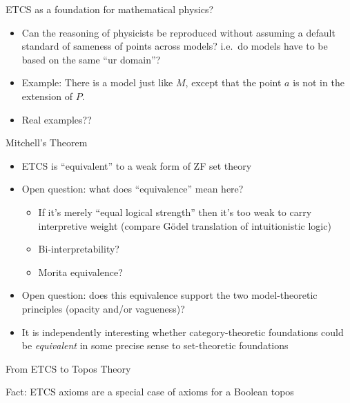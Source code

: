 \documentclass{beamer}
\begin{document}
\begin{frame}{ETCS as a foundation for mathematical physics?}

\begin{itemize}
\item Can the reasoning of physicists be reproduced without assuming a
  default standard of sameness of points across models? i.e.\ do
  models have to be based on the same ``ur domain''?
\item Example: There is a model just like $M$, except that the point
  $a$ is not in the extension of $P$.
\item Real examples?? 
\end{itemize}

\end{frame}

\begin{frame}{Mitchell's Theorem}

  \begin{itemize}
  \item ETCS is ``equivalent'' to a weak form of ZF set theory
  \item Open question: what does ``equivalence'' mean here?
  \begin{itemize}
  \item If it's merely ``equal logical strength'' then it's too weak
    to carry interpretive weight (compare G\"odel translation of
    intuitionistic logic)
  \item Bi-interpretability? 
  \item Morita equivalence?
  \end{itemize}
\item Open question: does this equivalence support the two
  model-theoretic principles (opacity and/or vagueness)?
\item It is independently interesting whether category-theoretic
  foundations could be \emph{equivalent} in some precise sense to
  set-theoretic foundations
\end{itemize}

\end{frame}

\begin{frame}{From ETCS to Topos Theory}

Fact: ETCS axioms are a special case of axioms for a Boolean topos




\end{frame}
\end{document}
